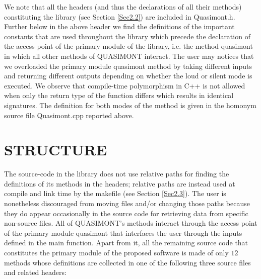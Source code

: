 \documentclass[a4paper, twosided]{book}
\begin{document}
\newpage
\noindent
We note that all the headers (and thus the declarations of all their methods) constituting the library (see Section \ref{Sec2.2}) are included in \colorbox{poliGrayBlue}{Quasimont.h}. Further below in the above header we find the definitions of the important constants that are used throughout the library which precede the declaration of the access point of the primary module of the library, i.e. the method \colorbox{poliGrayBlue}{quasimont} in which all other methods of QUASIMONT interact. The user may notices that we overloaded the primary module \colorbox{poliGrayBlue}{quasimont} method by taking different inputs and returning different outputs depending on whether the loud or silent mode is executed. We observe that compile-time polymorphism in C++ is not allowed when only the return type of the function differs which results in identical signatures. The definition for both modes of the method is given in the homonym source file \colorbox{poliGrayBlue}{Quasimont.cpp} reported above.

\section[Structure]{\changefont STRUCTURE}\label{Sec2.2}

\noindent
The source-code in the library does not use relative paths for finding the definitions of its methods in the headers; relative paths are instead used at compile and link time by the \colorbox{poliGrayBlue}{makefile} (see Section \ref{Sec2.3}). The user is nonetheless discouraged from moving files and/or changing those paths because they do appear occasionally in the source code for retrieving data from specific non-source files. All of QUASIMONT's methods interact through the access point of the primary module \colorbox{poliGrayBlue}{quasimont} that interfaces the user through the inputs defined in the \colorbox{poliGrayBlue}{main} function. Apart from it, all the remaining source code that constitutes the primary module of the proposed software is made of only $12$ methods whose definitions are collected in one of the following three source files and related headers:
\end{document}
